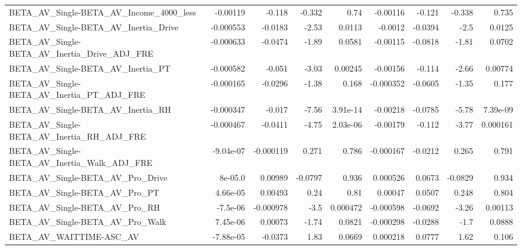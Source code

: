 \begin{tabular}{lrrrrrrrr}
BETA\_AV\_Single-BETA\_AV\_Income\_4000\_less            &    -0.00119 &       -0.118 &   -0.332 &     0.74 &   -0.00116 &      -0.121 &       -0.338 &         0.735 \\
BETA\_AV\_Single-BETA\_AV\_Inertia\_Drive               &   -0.000553 &      -0.0183 &    -2.53 &   0.0113 &    -0.0012 &     -0.0394 &         -2.5 &        0.0125 \\
BETA\_AV\_Single-BETA\_AV\_Inertia\_Drive\_ADJ\_FRE       &   -0.000633 &      -0.0474 &    -1.89 &   0.0581 &   -0.00115 &     -0.0818 &        -1.81 &        0.0702 \\
BETA\_AV\_Single-BETA\_AV\_Inertia\_PT                  &   -0.000582 &       -0.051 &    -3.03 &  0.00245 &   -0.00156 &      -0.114 &        -2.66 &       0.00774 \\
BETA\_AV\_Single-BETA\_AV\_Inertia\_PT\_ADJ\_FRE          &   -0.000165 &      -0.0296 &    -1.38 &    0.168 &  -0.000352 &     -0.0605 &        -1.35 &         0.177 \\
BETA\_AV\_Single-BETA\_AV\_Inertia\_RH                  &   -0.000347 &       -0.017 &    -7.56 & 3.91e-14 &   -0.00218 &     -0.0785 &        -5.78 &      7.39e-09 \\
BETA\_AV\_Single-BETA\_AV\_Inertia\_RH\_ADJ\_FRE          &   -0.000467 &      -0.0411 &    -4.75 & 2.03e-06 &   -0.00179 &      -0.112 &        -3.77 &      0.000161 \\
BETA\_AV\_Single-BETA\_AV\_Inertia\_Walk\_ADJ\_FRE        &   -9.04e-07 &    -0.000119 &    0.271 &    0.786 &  -0.000167 &     -0.0212 &        0.265 &         0.791 \\
BETA\_AV\_Single-BETA\_AV\_Pro\_Drive                   &     8e-05.0 &      0.00989 &  -0.0797 &    0.936 &   0.000526 &      0.0673 &      -0.0829 &         0.934 \\
BETA\_AV\_Single-BETA\_AV\_Pro\_PT                      &    4.66e-05 &      0.00493 &     0.24 &     0.81 &    0.00047 &      0.0507 &        0.248 &         0.804 \\
BETA\_AV\_Single-BETA\_AV\_Pro\_RH                      &    -7.5e-06 &    -0.000978 &     -3.5 & 0.000472 &  -0.000598 &     -0.0692 &        -3.26 &       0.00113 \\
BETA\_AV\_Single-BETA\_AV\_Pro\_Walk                    &    7.45e-06 &      0.00073 &    -1.74 &   0.0821 &  -0.000298 &     -0.0288 &         -1.7 &        0.0888 \\
BETA\_AV\_WAITTIME-ASC\_AV                            &   -7.88e-05 &      -0.0373 &     1.83 &   0.0669 &   0.000218 &      0.0777 &         1.62 &         0.106 \\

\end{tabular}

